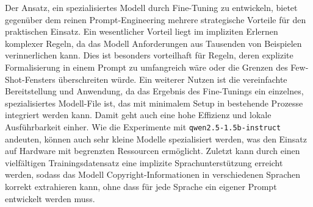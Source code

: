 Der Ansatz, ein spezialisiertes Modell durch Fine-Tuning zu entwickeln, bietet gegenüber dem reinen Prompt-Engineering mehrere strategische Vorteile für den praktischen Einsatz.
Ein wesentlicher Vorteil liegt im impliziten Erlernen komplexer Regeln, da das Modell Anforderungen aus Tausenden von Beispielen verinnerlichen kann.
Dies ist besonders vorteilhaft für Regeln, deren explizite Formalisierung in einem Prompt zu umfangreich wäre oder die Grenzen des Few-Shot-Fensters überschreiten würde.
Ein weiterer Nutzen ist die vereinfachte Bereitstellung und Anwendung, da das Ergebnis des Fine-Tunings ein einzelnes, spezialisiertes Modell-File ist, das mit minimalem Setup in bestehende Prozesse integriert werden kann.
Damit geht auch eine hohe Effizienz und lokale Ausführbarkeit einher.
Wie die Experimente mit \texttt{qwen2.5-1.5b-instruct} andeuten, können auch sehr kleine Modelle spezialisiert werden, was den Einsatz auf Hardware mit begrenzten Ressourcen ermöglicht.
Zuletzt kann durch einen vielfältigen Trainingsdatensatz eine implizite Sprachunterstützung erreicht werden, sodass das Modell Copyright-Informationen in verschiedenen Sprachen korrekt extrahieren kann, ohne dass für jede Sprache ein eigener Prompt entwickelt werden muss.









